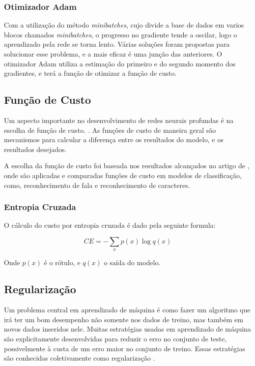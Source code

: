 \documentclass[12pt]{article}
\begin{document}
\subsubsection{Otimizador Adam}

Com a utilização do método \textit{minibatches}, cujo divide a base de dados em varios blocos chamados \textit{minibatches}, o progresso no gradiente tende a oscilar, logo o aprendizado pela rede se torna lento. Várias soluções foram propostas para solucionar esse problema, e a mais eficaz é uma junção das anteriores. O otimizador Adam \cite{DBLP:journals/corr/KingmaB14} utiliza a estimação do primeiro e do segundo momento dos gradientes, e terá a função de otimizar a função de custo.

\subsection{Função de Custo}

Um aspecto importante no desenvolvimento de redes neurais profundas é na escolha de função de custo. \cite{Goodfellow-et-al-2016}. As funções de custo de maneira geral são mecanismos para calcular a diferença entre os resultados do modelo, e os resultados desejados.

A escolha da função de custo foi baseada nos resultados alcançados no artigo de \cite{golik:2013}, onde são aplicadas e comparadas funções de custo em modelos de classificação, como, reconhecimento de fala e reconhecimento de caracteres.

\subsubsection{Entropia Cruzada}

O cálculo do custo por entropia cruzada é dado pela seguinte formula:

\begin{equation}
    CE = -\sum\limits_{x} p(x)\log q(x)
\end{equation}

Onde $p(x)$ é o rótulo, e $q(x)$ o saída do modelo.
\subsection{Regularização}

Um problema central em aprendizado de máquina é como fazer um algoritmo que irá ter um bom desempenho não somente nos dados de treino, mas também em novos dados inseridos nele. Muitas estratégias usadas em aprendizado de máquina são explicitamente desenvolvidas para reduzir o erro no conjunto de teste, possivelmente à custa de um erro maior no conjunto de treino. Essas estratégias são conhecidas coletivamente como regularização \cite{Goodfellow-et-al-2016}.
\end{document}
